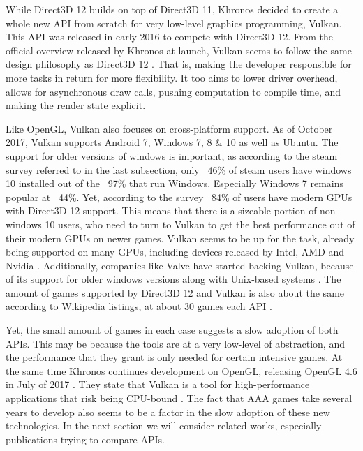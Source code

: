 While Direct3D 12 builds on top of Direct3D 11, Khronos decided to create a whole new \gls{API} from scratch for very low-level graphics programming, Vulkan.
This \gls{API} was released in early 2016 to compete with Direct3D 12.
From the official overview released by Khronos at launch, Vulkan seems to follow the same design philosophy as Direct3D 12 \cite{vulkanPresentationFeb2016}.
That is, making the developer responsible for more tasks in return for more flexibility.
It too aims to lower driver overhead, allows for asynchronous draw calls, pushing computation to compile time, and making the render state explicit.


Like OpenGL, Vulkan also focuses on cross-platform support.
As of October 2017, Vulkan supports Android 7, Windows 7, 8 \& 10 as well as Ubuntu\cite{vulkanConformance}.
The support for older versions of windows is important, as according to the steam survey referred to in the last subsection, only ~46\% of steam users have windows 10 installed out of the ~97\% that run Windows\cite{steamStats}.
Especially Windows 7 remains popular at ~44\%. Yet, according to the survey ~84\% of users have modern \glspl{GPU} with Direct3D 12 support.
This means that there is a sizeable portion of non-windows 10 users, who need to turn to Vulkan to get the best performance out of their modern \glspl{GPU} on newer games.
Vulkan seems to be up for the task, already being supported on many \glspl{GPU}, including devices released by Intel, AMD and Nvidia \cite{vulkanConformance}.
Additionally, companies like Valve have started backing Vulkan, because of its support for older windows versions along with Unix-based systems \cite{siggraph2015}.
The amount of games supported by Direct3D 12 and Vulkan is also about the same according to Wikipedia listings, at about 30 games each \gls{API} \cite{wikiVulkanGames} \cite{wikiDX12Games}.


Yet, the small amount of games in each case suggests a slow adoption of both \glspl{API}.
This may be because the tools are at a very low-level of abstraction, and the performance that they grant is only needed for certain intensive games.
At the same time Khronos continues development on OpenGL, releasing OpenGL 4.6 in July of 2017 \cite{wikiOpenGL}.
They state that Vulkan is a tool for high-performance applications that risk being CPU-bound \cite{vulkanPresentationFeb2016}. 
The fact that AAA games take several years to develop also seems to be a factor in the slow adoption of these new technologies.
In the next section we will consider related works, especially publications trying to compare \glspl{API}. 


